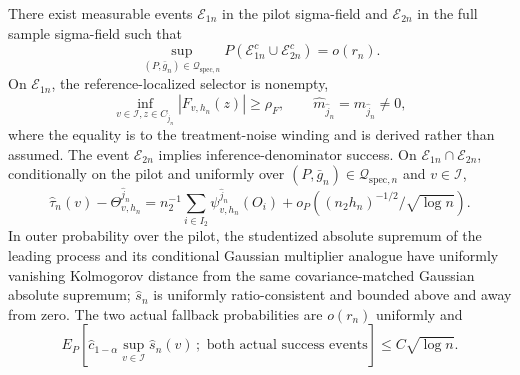 There exist measurable events \(\mathcal E_{1n}\) in the pilot sigma-field and \(\mathcal E_{2n}\) in the full sample sigma-field such that
\[
 \sup_{(P,\bar g_n)\in\mathcal Q_{\mathrm{spec},n}}
 P(\mathcal E_{1n}^c\cup\mathcal E_{2n}^c)=o(r_n).
\]
On \(\mathcal E_{1n}\), the reference-localized selector is nonempty,
\[
 \inf_{v\in\mathcal I,z\in C_{\widehat j_n}}|F_{v,h_n}(z)|\ge\rho_F,
 \qquad
 \widehat m_{\widehat j_n}=m_{\widehat j_n}\ne0,
\]
where the equality is to the treatment-noise winding and is derived rather than assumed.  The event \(\mathcal E_{2n}\) implies inference-denominator success.  On \(\mathcal E_{1n}\cap\mathcal E_{2n}\), conditionally on the pilot and uniformly over \((P,\bar g_n)\in\mathcal Q_{\mathrm{spec},n}\) and \(v\in\mathcal I\),
\[
 \widehat\tau_n(v)-\Theta^{\widehat j_n}_{v,h_n}
 =n_2^{-1}\sum_{i\in I_2}\psi^{\widehat j_n}_{v,h_n}(O_i)
 +o_P\!\left((n_2h_n)^{-1/2}/\sqrt{\log n}\right).
\]
In outer probability over the pilot, the studentized absolute supremum of the leading process and its conditional Gaussian multiplier analogue have uniformly vanishing Kolmogorov distance from the same covariance-matched Gaussian absolute supremum; \(\widehat s_n\) is uniformly ratio-consistent and bounded above and away from zero.  The two actual fallback probabilities are \(o(r_n)\) uniformly and
\[
 E_P\!\left[\widehat c_{1-\alpha}\sup_{v\in\mathcal I}\widehat s_n(v)\,;\text{ both actual success events}\right]\le C\sqrt{\log n}.
\]